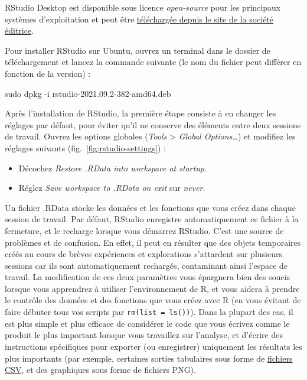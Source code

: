 \documentclass[
  french,
]{scrbook}
\newenvironment{Shaded}{\begin{snugshade}}{\end{snugshade}}
\newcommand{\AttributeTok}[1]{\textcolor[rgb]{0.77,0.63,0.00}{#1}}
\newcommand{\FunctionTok}[1]{\textcolor[rgb]{0.00,0.00,0.00}{#1}}
\newcommand{\NormalTok}[1]{#1}
\providecommand{\tightlist}{%
  \setlength{\itemsep}{0pt}\setlength{\parskip}{0pt}}
\begin{document}
RStudio Desktop est disponible sous licence \emph{open-source} pour les principaux systèmes d'exploitation et peut être \href{https://www.rstudio.com/products/rstudio/download/\#download}{téléchargée depuis le site de la société éditrice}.

Pour installer RStudio sur Ubuntu, ouvrez un terminal dans le dossier de téléchargement et lancez la commande suivante (le nom du fichier peut différer en fonction de la version) :

\begin{Shaded}
\begin{Highlighting}[]
\FunctionTok{sudo}\NormalTok{ dpkg }\AttributeTok{{-}i}\NormalTok{ rstudio{-}2021.09.2{-}382{-}amd64.deb}
\end{Highlighting}
\end{Shaded}

\begin{tcolorbox}[fonttitle=\sffamily\bfseries\large,title=Important,colframe=darkgreen]

Après l'installation de RStudio, la première étape consiste à en changer les réglages par défaut, pour éviter qu'il ne conserve des éléments entre deux sessions de travail. Ouvrez les options globales (\emph{Tools} \textgreater{} \emph{Global Options\ldots{}}) et modifiez les réglages suivants (fig.~\ref{fig:rstudio-settings}) :

\begin{itemize}
\tightlist
\item
  Décochez \emph{Restore .RData into workspace at startup}.
\item
  Réglez \emph{Save workspace to .RData on exit} sur \emph{never}.
\end{itemize}

Un fichier .RData stocke les données et les fonctions que vous créez dans chaque session de travail. Par défaut, RStudio enregistre automatiquement ce fichier à la fermeture, et le recharge lorsque vous démarrez RStudio. C'est une source de problèmes et de confusion. En effet, il peut en résulter que des objets temporaires créés au cours de brèves expériences et explorations s'attardent sur plusieurs sessions car ils sont automatiquement rechargés, contaminant ainsi l'espace de travail. La modification de ces deux paramètres vous épargnera bien des soucis lorsque vous apprendrez à utiliser l'environnement de R, et vous aidera à prendre le contrôle des données et des fonctions que vous créez avec R (en vous évitant de faire débuter tous vos scripts par \texttt{rm(list\ =\ ls())}). Dans la plupart des cas, il est plus simple et plus efficace de considérer le code que vous écrivez comme le produit le plus important lorsque vous travaillez sur l'analyse, et d'écrire des instructions spécifiques pour exporter (ou enregistrer) uniquement les résultats les plus importants (par exemple, certaines sorties tabulaires sous forme de \protect\hyperlink{csv}{fichiers CSV}, et des graphiques sous forme de fichiers PNG).

\end{tcolorbox}
\end{document}
